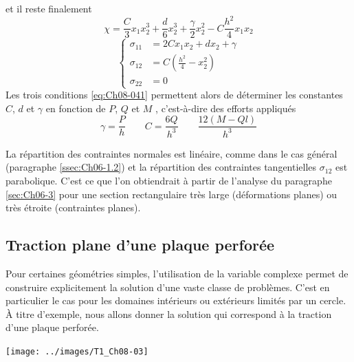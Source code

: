 et il reste finalement
\begin{equation}
  \chi = \frac{C}{3} x_1 x_2^3 + \frac{d}{6} x_2^3 +\frac{\gamma}{2} x_2^2 - C\frac{h^2}{4} x_1 x_2
    \label{eq:Ch08-044}
\end{equation}
\begin{equation}
  \left\{
  \begin{aligned}
    \sigma_{11} & = 2 C x_1 x_2 + d x_2 + \gamma \\
    \sigma_{12} & = C (\frac{h^2}{4} - x_2^2) \\
    \sigma_{22} & = 0
  \end{aligned}
  \right.
    \label{eq:Ch08-045}
\end{equation}
Les trois conditions \eqref{eq:Ch08-041} permettent alors de déterminer les constantes $C$, $d$ et $\gamma$ en fonction de $P$, $Q$ et $M$ , c'est-à-dire des efforts appliqués 
\begin{equation}
  \gamma = \frac{P}{h} \qquad C = \frac{6Q}{h^3} \qquad \frac{12(M-Ql)}{h^3}
    \label{eq:Ch08-044}
\end{equation}

La répartition des contraintes normales est linéaire, comme dans le cas général (paragraphe \ref{ssec:Ch06-1.2}) et la répartition des contraintes tangentielles $\sigma_{12}$ est parabolique. C'est ce que l'on obtiendrait à partir de l'analyse du paragraphe \ref{sec:Ch06-3} pour une section rectangulaire très large (déformations planes) ou très étroite (contraintes planes). 

\subsection{Traction plane d'une plaque perforée}\label{ssec:Ch08-2.2}
Pour certaines géométries simples, l'utilisation de la variable complexe permet de construire explicitement la solution d'une vaste classe de problèmes. 
C'est en particulier le cas pour les domaines intérieurs ou extérieurs limités par un cercle. 
À titre d'exemple, nous allons donner la solution qui correspond à la traction d'une plaque perforée. 
\begin{center}
    \texttt{[image: ../images/T1\_Ch08-03]}
\end{center}

